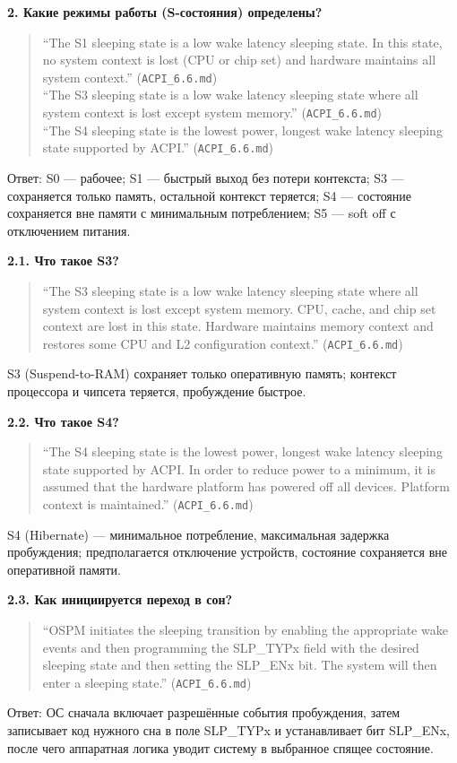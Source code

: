 \documentclass[a4paper,12pt]{article}
\begin{document}
\textbf{2. Какие режимы работы (S-состояния) определены?} 
\begin{quote}
``The S1 sleeping state is a low wake latency sleeping state. In this state, no system context is lost (CPU or chip set) and hardware maintains all system context.'' (\texttt{ACPI\_6.6.md}) \\
``The S3 sleeping state is a low wake latency sleeping state where all system context is lost except system memory.'' (\texttt{ACPI\_6.6.md}) \\
``The S4 sleeping state is the lowest power, longest wake latency sleeping state supported by ACPI.'' (\texttt{ACPI\_6.6.md})
\end{quote}
Ответ: S0 — рабочее; S1 — быстрый выход без потери контекста; S3 — сохраняется только память, остальной контекст теряется; S4 — состояние сохраняется вне памяти с минимальным потреблением; S5 — soft off с отключением питания.

\textbf{2.1. Что такое S3?} 
\begin{quote}
``The S3 sleeping state is a low wake latency sleeping state where all system context is lost except system memory. CPU, cache, and chip set context are lost in this state. Hardware maintains memory context and restores some CPU and L2 configuration context.'' (\texttt{ACPI\_6.6.md})
\end{quote}
S3 (Suspend-to-RAM) сохраняет только оперативную память; контекст процессора и чипсета теряется, пробуждение быстрое.

\textbf{2.2. Что такое S4?} 
\begin{quote}
``The S4 sleeping state is the lowest power, longest wake latency sleeping state supported by ACPI. In order to reduce power to a minimum, it is assumed that the hardware platform has powered off all devices. Platform context is maintained.'' (\texttt{ACPI\_6.6.md})
\end{quote}
S4 (Hibernate) — минимальное потребление, максимальная задержка пробуждения; предполагается отключение устройств, состояние сохраняется вне оперативной памяти.

\textbf{2.3. Как инициируется переход в сон?} 
\begin{quote}
``OSPM initiates the sleeping transition by enabling the appropriate wake events and then programming the SLP\_TYPx field with the desired sleeping state and then setting the SLP\_ENx bit. The system will then enter a sleeping state.'' (\texttt{ACPI\_6.6.md})
\end{quote}
Ответ: ОС сначала включает разрешённые события пробуждения, затем записывает код нужного сна в поле SLP\_TYPx и устанавливает бит SLP\_ENx, после чего аппаратная логика уводит систему в выбранное спящее состояние.
\end{document}
